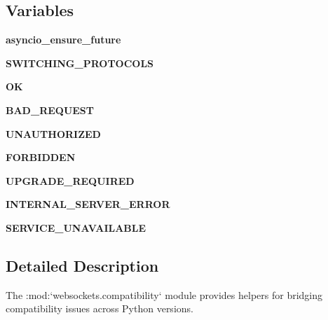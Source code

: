\subsection*{Variables}
\begin{DoxyCompactItemize}
\item 
\mbox{\label{namespacewebsockets_1_1compatibility_ad29a814bbe361d2643e16872f2bf1e69}} 
{\bfseries asyncio\+\_\+ensure\+\_\+future}
\item 
\mbox{\label{namespacewebsockets_1_1compatibility_a64b948c65f78fa9887d6348eec381b2d}} 
{\bfseries S\+W\+I\+T\+C\+H\+I\+N\+G\+\_\+\+P\+R\+O\+T\+O\+C\+O\+LS}
\item 
\mbox{\label{namespacewebsockets_1_1compatibility_ab345b53735d7ca4b74bdbfdfe4d88b1f}} 
{\bfseries OK}
\item 
\mbox{\label{namespacewebsockets_1_1compatibility_a4d7b897f605abc0190dd66c12c8a580b}} 
{\bfseries B\+A\+D\+\_\+\+R\+E\+Q\+U\+E\+ST}
\item 
\mbox{\label{namespacewebsockets_1_1compatibility_aa0ffdd24bbc947ff97b43fb04f946306}} 
{\bfseries U\+N\+A\+U\+T\+H\+O\+R\+I\+Z\+ED}
\item 
\mbox{\label{namespacewebsockets_1_1compatibility_aa932b23dbcc38d85bea80382d1f84dcb}} 
{\bfseries F\+O\+R\+B\+I\+D\+D\+EN}
\item 
\mbox{\label{namespacewebsockets_1_1compatibility_ac9628b27fd83bfc3ad5e304e7fe0bf76}} 
{\bfseries U\+P\+G\+R\+A\+D\+E\+\_\+\+R\+E\+Q\+U\+I\+R\+ED}
\item 
\mbox{\label{namespacewebsockets_1_1compatibility_a8d28db722937d27745a2d4fefd61a5c6}} 
{\bfseries I\+N\+T\+E\+R\+N\+A\+L\+\_\+\+S\+E\+R\+V\+E\+R\+\_\+\+E\+R\+R\+OR}
\item 
\mbox{\label{namespacewebsockets_1_1compatibility_ad66e45815faa04fee8e60db25b3bfdd1}} 
{\bfseries S\+E\+R\+V\+I\+C\+E\+\_\+\+U\+N\+A\+V\+A\+I\+L\+A\+B\+LE}
\end{DoxyCompactItemize}


\subsection{Detailed Description}
\begin{DoxyVerb}The :mod:`websockets.compatibility` module provides helpers for bridging
compatibility issues across Python versions.\end{DoxyVerb}
 